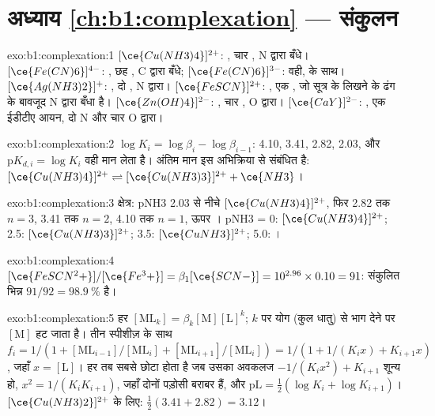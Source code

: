 \section*{अध्याय \ref{ch:b1:complexation} --- संकुलन}

\begin{solution}{exo:b1:complexation:1}
$[\ce{Cu(NH3)4}]^{2+}$: , चार , N द्वारा बँधे।
$[\ce{Fe(CN)6}]^{4-}$: , छह , C द्वारा बँधे;
$[\ce{Fe(CN)6}]^{3-}$: वही,  के साथ। $[\ce{Ag(NH3)2}]^{+}$:
, दो , N द्वारा। $[\ce{FeSCN}]^{2+}$: , एक
, जो सूत्र के लिखने के ढंग के बावजूद N द्वारा बँधा है।
$[\ce{Zn(OH)4}]^{2-}$: , चार , O द्वारा।
$[\ce{CaY}]^{2-}$: , एक ईडीटीए आयन, दो N और चार O द्वारा।
\end{solution}

\begin{solution}{exo:b1:complexation:2}
$\log K_i = \log\beta_i - \log\beta_{i-1}$: 4.10, 3.41, 2.82, 2.03, और
$\mathrm{p}K_{d,i} = \log K_i$ वही मान लेता है। अंतिम मान इस अभिक्रिया से संबंधित है:
$[\ce{Cu(NH3)4}]^{2+} \rightleftharpoons [\ce{Cu(NH3)3}]^{2+} + \ce{NH3}$।
\end{solution}

\begin{solution}{exo:b1:complexation:3}
क्षेत्र: pNH3 2.03 से नीचे $[\ce{Cu(NH3)4}]^{2+}$, फिर 2.82 तक $n = 3$,
3.41 तक $n = 2$, 4.10 तक $n = 1$, ऊपर । pNH3 = 0:
$[\ce{Cu(NH3)4}]^{2+}$; 2.5: $[\ce{Cu(NH3)3}]^{2+}$; 3.5:
$[\ce{CuNH3}]^{2+}$; 5.0: ।
\end{solution}

\begin{solution}{exo:b1:complexation:4}
$[\ce{FeSCN^2+}]/[\ce{Fe^3+}] = \beta_1[\ce{SCN-}] = 10^{2.96} \times 0.10 =
91$: संकुलित भिन्न $91/92 = \qty{98.9}{\percent}$ है।
\end{solution}

\begin{solution}{exo:b1:complexation:5}
हर $[\mathrm{ML}_k] = \beta_k[\mathrm{M}][\mathrm{L}]^k$; $k$ पर योग
(कुल धातु) से भाग देने पर $[\mathrm{M}]$ हट जाता है। तीन
स्पीशीज़ के साथ $f_i = 1/(1 + [\mathrm{ML}_{i-1}]/[\mathrm{ML}_i] +
[\mathrm{ML}_{i+1}]/[\mathrm{ML}_i]) = 1/(1 + 1/(K_i x) + K_{i+1}x)$, जहाँ
$x = [\mathrm{L}]$। हर तब सबसे छोटा होता है जब उसका अवकलज
$-1/(K_i x^2) + K_{i+1}$ शून्य हो, $x^2 = 1/(K_iK_{i+1})$, जहाँ दोनों
पड़ोसी बराबर हैं, और $\mathrm{pL} = \frac12(\log K_i + \log K_{i+1})$।
$[\ce{Cu(NH3)2}]^{2+}$ के लिए: $\frac12(3.41 + 2.82) = 3.12$।
\end{solution}

